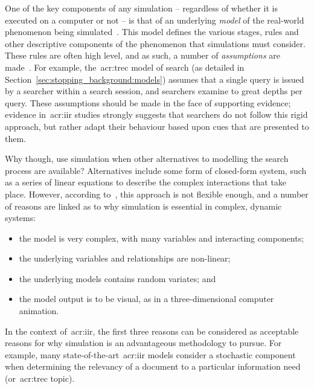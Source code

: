 One of the key components of any simulation -- regardless of whether it is executed on a computer or not -- is that of an underlying \emph{model} of the real-world phenomenon being simulated~\citep{tocher1963art_of_simulation}. This model defines the various stages, rules and other descriptive components of the phenomenon that simulations must consider. These rules are often high level, and as such, a number of \emph{assumptions} are made~\citep{tocher1963art_of_simulation}. For example, the~\gls{acr:trec} model of search (as detailed in Section~\ref{sec:stopping_background:models}) assumes that a single query is issued by a searcher within a search session, and searchers examine to great depths per query. These assumptions should be made in the face of supporting evidence; evidence in~\gls{acr:iir} studies strongly suggests that searchers do not follow this rigid approach, but rather adapt their behaviour based upon cues that are presented to them.

Why though, use simulation when other alternatives to modelling the search process are available? Alternatives include some form of closed-form system, such as a series of linear equations to describe the complex interactions that take place. However, according to~\cite{fishwick1995simulation}, this approach is not flexible enough, and a number of reasons are linked as to why simulation is essential in complex, dynamic systems:

\begin{itemize}
    \item{the model is very complex, with many variables and interacting components;}
    \item{the underlying variables and relationships are non-linear;}
    \item{the underlying models contains random variates; and}
    \item{the model output is to be visual, as in a three-dimensional computer animation.}
\end{itemize}

In the context of~\gls{acr:iir}, the first three reasons can be considered as acceptable reasons for why simulation is an advantageous methodology to pursue. For example, many state-of-the-art~\gls{acr:iir} models consider a stochastic component when determining the relevancy of a document to a particular information need (or~\gls{acr:trec} topic).

